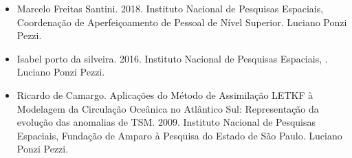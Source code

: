 \documentclass[11pt, a4paper]{awesome-cv}
\begin{document}
\begin{cvletter}
\begin{itemize}
  \item[] Marcelo Freitas Santini. 2018. Instituto Nacional de Pesquisas Espaciais, Coordenação de Aperfeiçoamento de Pessoal de Nível Superior. Luciano Ponzi Pezzi. 
  \item[] Isabel porto da silveira. 2016. Instituto Nacional de Pesquisas Espaciais, . Luciano Ponzi Pezzi. 
  \item[] Ricardo de Camargo. Aplicações do Método de Assimilação LETKF à Modelagem da Circulação Oceânica no Atlântico Sul: Representação da evolução das anomalias de TSM. 2009. Instituto Nacional de Pesquisas Espaciais, Fundação de Amparo à Pesquisa do Estado de São Paulo. Luciano Ponzi Pezzi. 
\end{itemize}


\end{cvletter}
\end{document}
